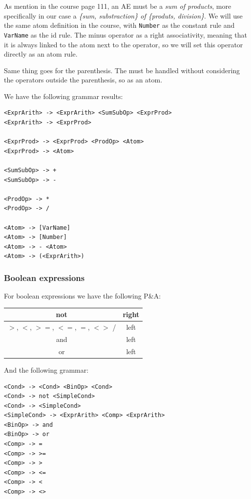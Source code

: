 \documentclass[letterpaper]{article}
\begin{document}
As mention in the course page 111, an AE must be a \textit{sum of products},
more specifically in our case a \textit{\{sum, substraction\}
of \{produts, division\}}. We will use the same atom definition in the course,
with \texttt{Number} as the constant rule and \texttt{VarName} as the id rule.
The minus operator as a right associativity, meaning that it is always linked
to the atom next to the operator, so we will set this operator directly as
an atom rule.

Same thing goes for the parenthesis. The must be handled without considering
the operators outside the parenthesis, so as an atom.

We have the following grammar results:

\begin{lstlisting}
<ExprArith> -> <ExprArith> <SumSubOp> <ExprProd>
<ExprArith> -> <ExprProd>

<ExprProd> -> <ExprProd> <ProdOp> <Atom>
<ExprProd> -> <Atom>

<SumSubOp> -> +
<SumSubOp> -> -

<ProdOp> -> *
<ProdOp> -> /

<Atom> -> [VarName]
<Atom> -> [Number]
<Atom> -> - <Atom>
<Atom> -> (<ExprArith>)
\end{lstlisting}


\subsubsection{Boolean expressions}

For boolean expressions we have the following P\&A:


\begin{tabular}{|c|c|}
    \hline
    not & right \\
    \hline
    $>$, $<$, $>=$, $<=$, $=$, $<>$ / & left \\
    \hline
    and & left \\
    \hline
    or & left \\
    \hline
\end{tabular}

And the following grammar:

\begin{lstlisting}
<Cond> -> <Cond> <BinOp> <Cond>
<Cond> -> not <SimpleCond>
<Cond> -> <SimpleCond>
<SimpleCond> -> <ExprArith> <Comp> <ExprArith>
<BinOp> -> and
<BinOp> -> or
<Comp> -> =
<Comp> -> >=
<Comp> -> >
<Comp> -> <=
<Comp> -> <
<Comp> -> <>
\end{lstlisting}
\end{document}

